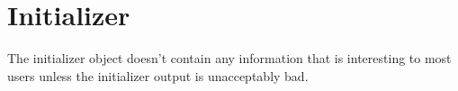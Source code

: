 \section{Initializer}
\label{sec:initializer}

The initializer object doesn't contain any information that is interesting to most users
unless the initializer output is unacceptably bad.